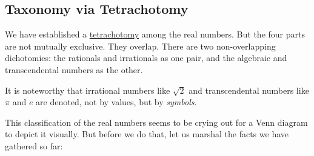 \documentclass[
  a4paper,
]{article}
\begin{document}
\subsection{Taxonomy via Tetrachotomy}\label{taxonomy-via-tetrachotomy}

We have established a
\href{https://www.collinsdictionary.com/dictionary/english/tetrachotomy}{tetrachotomy}
among the real numbers. But the four parts are not mutually exclusive.
They overlap. There are two non-overlapping dichotomies: the rationals
and irrationals as one pair, and the algebraic and transcendental
numbers as the other.

It is noteworthy that irrational numbers like \(\sqrt{2}\) and
transcendental numbers like \(\pi\) and \(e\) are denoted, not by
values, but by \emph{symbols}.

This classification of the real numbers seems to be crying out for a
Venn diagram to depict it visually. But before we do that, let us
marshal the facts we have gathered so far:
\end{document}
